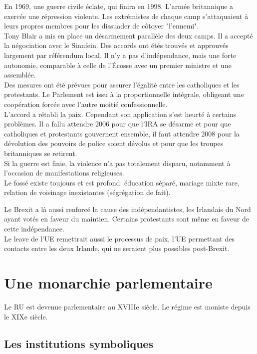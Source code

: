 \documentclass[10pt, a4paper, openany]{book}
\begin{document}
En 1969, une guerre civile éclate, qui finira en 1998. L'armée britannique a exercée une répression violente. Les extrémistes de chaque camp s'attaquaient à leurs propres membres pour les dissuader de côtoyer "l'ennemi". \\
Tony Blair a mis en place un désarmement parallèle des deux camps. Il a accepté la négociation avec le Sinnfein. Des accords ont étés trouvés et approuvés largement par référendum local. Il n'y a pas d'indépendance, mais une forte autonomie, comparable à celle de l'Écosse avec un premier ministre et une assemblée. \\
Des mesures ont été prévues pour assurer l'égalité entre les catholiques et les protestants. Le Parlement est issu à la proportionnelle intégrale, obligeant une coopération forcée avec l'autre moitié confessionnelle. \\
L'accord a rétabli la paix. Cependant son application s'est heurté à certains problèmes. Il a fallu attendre 2006 pour que l'IRA se désarme et pour que catholiques et protestants gouvernent ensemble, il faut attendre 2008 pour la dévolution des pouvoirs de police soient dévolus et pour que les troupes britanniques se retirent. \\
Si la guerre est finie, la violence n'a pas totalement disparu, notamment à l'occasion de manifestations religieuses. \\
Le fossé existe toujours et est profond: éducation séparé, mariage mixte rare, relation de voisinage inexistantes (ségrégation de fait). 


Le Brexit a là aussi renforcé la cause des indépendantistes, les Irlandais du Nord ayant votés en faveur du maintien. Certains protestants sont même en faveur de cette indépendance. \\
Le leave de l'UE remettrait aussi le processus de paix, l'UE permettant des contacts entre les deux Irlande, qui ne seraient plus possibles post-Brexit.

\section{Une monarchie parlementaire}

Le RU est devenue parlementaire au XVIIIe siècle. Le régime est moniste depuis le XIXe siècle. 

\subsection{Les institutions symboliques}
\end{document}
